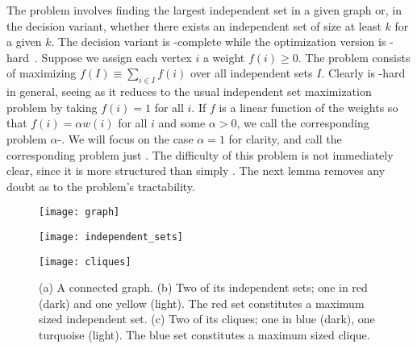 The \iset problem involves finding the largest independent set in a given  graph or,  in  the decision variant,  whether there exists an independent  set of size at least  $k$ for a given $k$.  The decision variant  is  \NP-complete while the optimization version is \NP-hard~\cite{karp1972reducibility}.  
Suppose we assign each vertex $i$ a weight $f(i)\geq 0$. The \mwis problem consists of maximizing $f(I)\equiv \sum_{i\in I}f(i)$ over all independent sets $I$. Clearly \mwis is \NP-hard in general, seeing as it reduces to the usual independent set maximization problem by taking $f(i)=1$ for all $i$. If $f$ is a linear function of the weights so that $f(i)=\alpha w(i)$ for all $i$ and some $\alpha> 0$, we call the corresponding problem $\alpha$-\vwis. We will focus on the case $\alpha=1$ for clarity, and call the  corresponding problem just \vwis. The difficulty of this problem is not immediately clear, since it is more structured than simply \mwis. The next lemma removes any doubt as to the problem's tractability.   

\begin{figure}
	\centering
	\begin{minipage}{0.3\textwidth}
		\centering
		\texttt{[image: graph]}
		\subcaption{}
	\end{minipage}
	\begin{minipage}{0.3\textwidth}
		\centering
		\texttt{[image: independent\_sets]}
		\subcaption{}
	\end{minipage}
	\begin{minipage}{0.3\textwidth}
		\centering
		\texttt{[image: cliques]}
		\subcaption{}
	\end{minipage}
	\caption{(a) A connected  graph. (b) Two of its independent sets; one in red (dark) and one yellow (light). The red set constitutes a maximum sized independent set. (c) Two of its cliques; one in blue (dark), one  turquoise (light). The blue  set constitutes a maximum sized clique.}
	\label{fig:is+cliques}
\end{figure}

